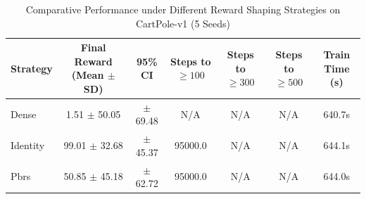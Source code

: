 \begin{table}[t]
\centering
\caption{Comparative Performance under Different Reward Shaping Strategies on CartPole-v1 (5 Seeds)}
\label{tab:reward_shaping_comparison}
\begin{tabular}{lcccccc}
\hline
\textbf{Strategy} & \textbf{Final Reward (Mean $\pm$ SD)} & \textbf{95\% CI} & \textbf{Steps to $\ge 100$} & \textbf{Steps to $\ge 300$} & \textbf{Steps to $\ge 500$} & \textbf{Train Time (s)} \\
\hline
Dense & 1.51 $\pm$ 50.05 & $\pm$ 69.48 & N/A & N/A & N/A & 640.7s \\
Identity & 99.01 $\pm$ 32.68 & $\pm$ 45.37 & 95000.0 & N/A & N/A & 644.1s \\
Pbrs & 50.85 $\pm$ 45.18 & $\pm$ 62.72 & 95000.0 & N/A & N/A & 644.0s \\
\hline
\end{tabular}
\end{table}
